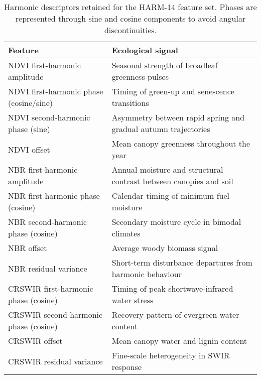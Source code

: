 \documentclass[utf8]{FrontiersinHarvard}
\begin{document}
\begin{table}[H]
    \centering
    \small
    \begin{tabular}{lp{}}
        \hline
        \textbf{Feature} & \textbf{Ecological signal} \\
        \hline
        NDVI first-harmonic amplitude & Seasonal strength of broadleaf greenness pulses \\
        NDVI first-harmonic phase (cosine/sine) & Timing of green-up and senescence transitions \\
        NDVI second-harmonic phase (sine) & Asymmetry between rapid spring and gradual autumn trajectories \\
        NDVI offset & Mean canopy greenness throughout the year \\
        NBR first-harmonic amplitude & Annual moisture and structural contrast between canopies and soil \\
        NBR first-harmonic phase (cosine) & Calendar timing of minimum fuel moisture \\
        NBR second-harmonic phase (cosine) & Secondary moisture cycle in bimodal climates \\
        NBR offset & Average woody biomass signal \\
        NBR residual variance & Short-term disturbance departures from harmonic behaviour \\
        CRSWIR first-harmonic phase (cosine) & Timing of peak shortwave-infrared water stress \\
        CRSWIR second-harmonic phase (cosine) & Recovery pattern of evergreen water content \\
        CRSWIR offset & Mean canopy water and lignin content \\
        CRSWIR residual variance & Fine-scale heterogeneity in SWIR response \\
        \hline
    \end{tabular}
    \caption{Harmonic descriptors retained for the HARM-14 feature set. Phases are represented through sine and cosine components to avoid angular discontinuities.}
    \label{tab:harmonic14}
\end{table}
\end{document}
